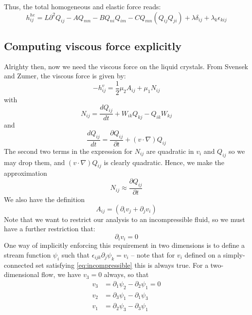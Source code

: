 \documentclass[reqno]{article}
\begin{document}
	Thus, the total homogeneous and elastic force reads:
	\begin{equation}
		h^{he}_{ij} = L\partial^2 Q_{ij} - A Q_{mn} - BQ_{ni}Q_{im} - C Q_{mn} (Q_{ij}Q_{ji}) + \lambda\delta_{ij} + \lambda_k \epsilon_{kij}
	\end{equation}
	
	\subsection{Computing viscous force explicitly}
	Alrighty then, now we need the viscous force on the liquid crystals. From Svensek and Zumer, the viscous force is given by:
	\begin{equation}
		-h^v_{ij} = \frac{1}{2} \mu_2 A_{ij} + \mu_1 N_{ij}
	\end{equation}
	with 
	\begin{equation}
		N_{ij} = \frac{d Q_{ij}}{dt} + W_{ik} Q_{kj} - Q_{ik} W_{kj}
	\end{equation}
	and
	\begin{equation}
		\frac{d Q_{ij}}{dt} = \frac{\partial Q_{ij}}{\partial t} + (v\cdot \nabla)Q_{ij}
	\end{equation}
	The second two terms in the expression for $N_{ij}$ are quadratic in $v_i$ and $Q_{ij}$ so we may drop them, and $(v\cdot \nabla)Q_{ij}$ is clearly quadratic. Hence, we make the approximation
	\begin{equation}
		N_{ij} \approx \frac{\partial Q_{ij}}{\partial t}
	\end{equation}
	We also have the definition
	\begin{equation}
		A_{ij} = (\partial_i v_j + \partial_j v_i)
	\end{equation}
	Note that we want to restrict our analysis to an incompressible fluid, so we must have a further restriction that:
	\begin{equation}\label{eq:incompressible}
		\partial_i v_i = 0
	\end{equation}
	One way of implicitly enforcing this requirement in two dimensions is to define a stream function $\psi_i$ such that $\epsilon_{ijk}\partial_j \psi_k = v_i$ -- note that for $v_i$ defined on a simply-connected set satisfying \eqref{eq:incompressible} this is always true. For a two-dimensional flow, we have $v_3 = 0$ always, so that 
	\begin{equation}
	\begin{split}
		v_3 &= \partial_1 \psi_2 - \partial_2 \psi_1 = 0 \\
		v_2 &= \partial_3 \psi_1 - \partial_1 \psi_3 \\
		v_1 &= \partial_2 \psi_3 - \partial_3 \psi_1
	\end{split}
	\end{equation}
\end{document}
